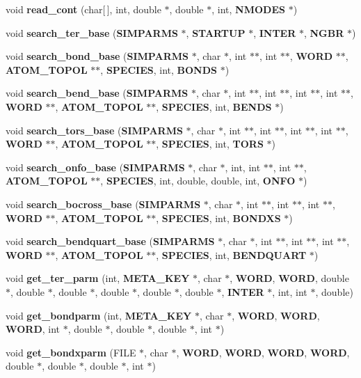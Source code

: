 \begin{CompactItemize}
\item 
void {\bf read\_\-cont} (char[$\,$], int, double $\ast$, double $\ast$, int, {\bf NMODES} $\ast$)
\item 
void {\bf search\_\-ter\_\-base} ({\bf SIMPARMS} $\ast$, {\bf STARTUP} $\ast$, {\bf INTER} $\ast$, {\bf NGBR} $\ast$)
\item 
void {\bf search\_\-bond\_\-base} ({\bf SIMPARMS} $\ast$, char $\ast$, int $\ast$$\ast$, int $\ast$$\ast$, {\bf WORD} $\ast$$\ast$, {\bf ATOM\_\-TOPOL} $\ast$$\ast$, {\bf SPECIES}, int, {\bf BONDS} $\ast$)
\item 
void {\bf search\_\-bend\_\-base} ({\bf SIMPARMS} $\ast$, char $\ast$, int $\ast$$\ast$, int $\ast$$\ast$, int $\ast$$\ast$, int $\ast$$\ast$, {\bf WORD} $\ast$$\ast$, {\bf ATOM\_\-TOPOL} $\ast$$\ast$, {\bf SPECIES}, int, {\bf BENDS} $\ast$)
\item 
void {\bf search\_\-tors\_\-base} ({\bf SIMPARMS} $\ast$, char $\ast$, int $\ast$$\ast$, int $\ast$$\ast$, int $\ast$$\ast$, int $\ast$$\ast$, {\bf WORD} $\ast$$\ast$, {\bf ATOM\_\-TOPOL} $\ast$$\ast$, {\bf SPECIES}, int, {\bf TORS} $\ast$)
\item 
void {\bf search\_\-onfo\_\-base} ({\bf SIMPARMS} $\ast$, char $\ast$, int, int $\ast$$\ast$, int $\ast$$\ast$, {\bf ATOM\_\-TOPOL} $\ast$$\ast$, {\bf SPECIES}, int, double, double, int, {\bf ONFO} $\ast$)
\item 
void {\bf search\_\-bocross\_\-base} ({\bf SIMPARMS} $\ast$, char $\ast$, int $\ast$$\ast$, int $\ast$$\ast$, int $\ast$$\ast$, {\bf WORD} $\ast$$\ast$, {\bf ATOM\_\-TOPOL} $\ast$$\ast$, {\bf SPECIES}, int, {\bf BONDXS} $\ast$)
\item 
void {\bf search\_\-bendquart\_\-base} ({\bf SIMPARMS} $\ast$, char $\ast$, int $\ast$$\ast$, int $\ast$$\ast$, int $\ast$$\ast$, {\bf WORD} $\ast$$\ast$, {\bf ATOM\_\-TOPOL} $\ast$$\ast$, {\bf SPECIES}, int, {\bf BENDQUART} $\ast$)
\item 
void {\bf get\_\-ter\_\-parm} (int, {\bf META\_\-KEY} $\ast$, char $\ast$, {\bf WORD}, {\bf WORD}, double $\ast$, double $\ast$, double $\ast$, double $\ast$, double $\ast$, double $\ast$, {\bf INTER} $\ast$, int, int $\ast$, double)
\item 
void {\bf get\_\-bondparm} (int, {\bf META\_\-KEY} $\ast$, char $\ast$, {\bf WORD}, {\bf WORD}, {\bf WORD}, int $\ast$, double $\ast$, double $\ast$, double $\ast$, int $\ast$)
\item 
void {\bf get\_\-bondxparm} (FILE $\ast$, char $\ast$, {\bf WORD}, {\bf WORD}, {\bf WORD}, {\bf WORD}, double $\ast$, double $\ast$, double $\ast$, int $\ast$)
$$
\end{CompactItemize}
